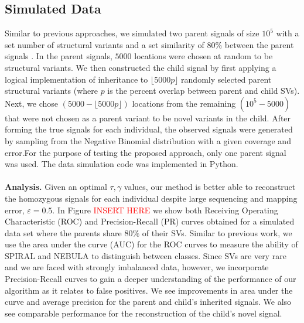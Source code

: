 \documentclass{article}
\begin{document}
\subsection{Simulated Data}
\label{subsec:simulated_data}
Similar to previous approaches, we simulated two parent signals of size $10^5$ with a set number of structural variants and a set similarity of $80\%$ between the parent signals \cite{MB_diploidTrios, MB_SingleParentDiploid}. In the parent signals, $5000$ locations were chosen at random to be structural variants. We then constructed the child signal by first applying a logical implementation of inheritance to $\lfloor 5000p \rfloor$ randomly selected parent structural variants (where $p$ is the percent overlap between parent and child SVs). Next, we chose  $(5000 - \lfloor 5000p \rfloor)$ locations from the remaining $(10^5 - 5000)$ that were not chosen as a parent variant to be novel variants in the child.  After forming the true signals for each individual, the observed signals were generated by sampling from the Negative Binomial distribution with a given coverage and error.For the purpose of testing the proposed approach, only one parent signal was used. The data simulation code was implemented in Python. \\\\
\textbf{Analysis.} Given an optimal $\tau, \gamma$ values, our method is better able to reconstruct the homozygous signals for each individual despite large sequencing and mapping error, $\varepsilon = 0.5$. In Figure \textcolor{red}{INSERT HERE} we show both Receiving Operating Characteristic (ROC) and Precision-Recall (PR) curves obtained for a simulated data set where the parents share $80\%$ of their SVs. Similar to previous work, we use the area under the curve (AUC) for the ROC curves to measure the ability of SPIRAL and NEBULA to distinguish between classes. %
Since SVs are very rare and we are faced with strongly imbalanced data, however, we incorporate Precision-Recall curves to gain a deeper understanding of the performance of our algorithm as it relates to false positives. We see improvements in area under the curve and average precision for the parent and child's inherited signals. We also see comparable performance for the reconstruction of the child's novel signal.
\end{document}

